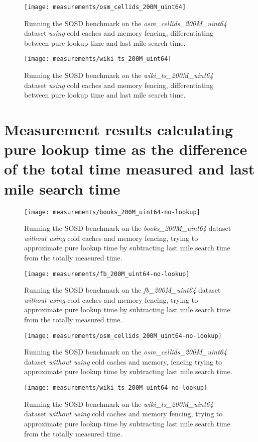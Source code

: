 \begin{figure}[!htb]
  \centering
  \texttt{[image: measurements/osm\_cellids\_200M\_uint64]}
  \caption*{
    Running the SOSD benchmark on the \emph{osm\_cellids\_200M\_uint64} dataset \emph{using} cold caches and memory fencing, differentiating between pure lookup time and last mile search time.
  }
\end{figure}

\begin{figure}[!htb]
  \centering
  \texttt{[image: measurements/wiki\_ts\_200M\_uint64]}
  \caption*{
    Running the SOSD benchmark on the \emph{wiki\_ts\_200M\_uint64} dataset \emph{using} cold caches and memory fencing, differentiating between pure lookup time and last mile search time.
  }
\end{figure}

\newpage %

\section{Measurement results calculating pure lookup time as the difference of the total time measured and last mile search time}
\label{sect:appendix:measurements-no-lookup}

\begin{figure}[!htb]
  \centering
  \texttt{[image: measurements/books\_200M\_uint64-no-lookup]}
  \caption*{
    Running the SOSD benchmark on the \emph{books\_200M\_uint64} dataset \emph{without using} cold caches and memory fencing, trying to approximate pure lookup time by subtracting last mile search time from the totally measured time.
  }
\end{figure}

\begin{figure}[!htb]
  \centering
  \texttt{[image: measurements/fb\_200M\_uint64-no-lookup]}
  \caption*{
    Running the SOSD benchmark on the \emph{fb\_200M\_uint64} dataset \emph{without using} cold caches and memory fencing, trying to approximate pure lookup time by subtracting last mile search time from the totally measured time.
  }
\end{figure}

\begin{figure}[!htb]
  \centering
  \texttt{[image: measurements/osm\_cellids\_200M\_uint64-no-lookup]}
  \caption*{
    Running the SOSD benchmark on the \emph{osm\_cellids\_200M\_uint64} dataset \emph{without using} cold caches and memory, fencing trying to approximate pure lookup time by subtracting last mile search time.
  }
\end{figure}

\begin{figure}[!htb]
  \centering
  \texttt{[image: measurements/wiki\_ts\_200M\_uint64-no-lookup]}
  \caption*{
    Running the SOSD benchmark on the \emph{wiki\_ts\_200M\_uint64} dataset \emph{without using} cold caches and memory fencing, trying to approximate pure lookup time by subtracting last mile search time from the totally measured time.
  }
\end{figure}
